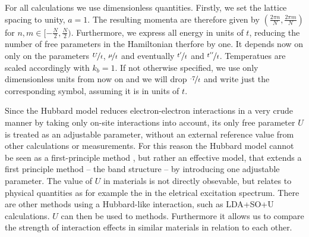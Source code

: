 \documentclass[a4paper,10pt]{report}
\begin{document}
For all calculations we use dimensionless quantities. 
Firstly, we set the lattice spacing to unity, $a=1$. 
The resulting momenta are therefore given by $(\frac{2\pi n}{N},\frac{2\pi m}{N})$ for $n,m \in [-\frac N2, \frac N2)$.
Furthermore, we express all energy in units of $t$, reducing the number of free parameters in the Hamiltonian therfore by one.
It depends now on only on the parameters $\nicefrac Ut$, $\nicefrac {\mu}t$ and eventually $\nicefrac{t^{\prime}}t$ and $\nicefrac{t^{\prime \prime}}t$.
Temperatues are scaled accordingly with $k_b=1$.
If not otherwise specified, we use only dimensionless units from now on and we will drop $\nicefrac{\cdot7}{t}$ and write just the corresponding symbol, 
assuming it is in units of $t$.


Since the Hubbard model reduces electron-electron interactions in a very crude manner by taking only on-site interactions into account,
its only free parameter $U$ is treated as an adjustable parameter, without an external reference value from other calculations or measurements.	
For this reason the Hubbard model cannot be seen as a first-principle method \cite{J.Phys.Cond.Matter.Vol21.34},
but rather an effective model, that extends a first principle method – the band structure – by introducing one adjustable parameter.
The value of $U$ in materials is not directly obsevable, but relates to physical quantities as for example the in the eletrical excitation spectrum.
There are other methods using a Hubbard-like interaction, such as LDA+SO+U calculations.
$U$ can then be used to methods. 
Furthermore it allows us to compare the strength of interaction effects in similar materials in relation to each other.
\end{document}
